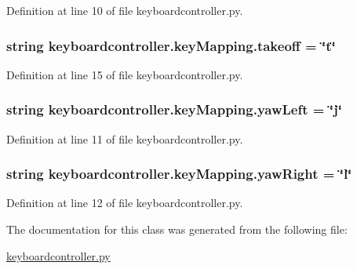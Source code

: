 Definition at line 10 of file keyboardcontroller.\-py.

\hypertarget{classkeyboardcontroller_1_1keyMapping_aaea5bb05c7a1f0dc6353fe686b5a8159}{
\subsubsection[{takeoff}]{\setlength{\rightskip}{0pt plus 5cm}string keyboardcontroller.\-key\-Mapping.\-takeoff = \char`\"{}t\char`\"{}\hspace{0.3cm}{\ttfamily [static]}}}\label{classkeyboardcontroller_1_1keyMapping_aaea5bb05c7a1f0dc6353fe686b5a8159}


Definition at line 15 of file keyboardcontroller.\-py.

\hypertarget{classkeyboardcontroller_1_1keyMapping_a8fe5634f1db0cb7509ec14446df8c6e3}{
\subsubsection[{yaw\-Left}]{\setlength{\rightskip}{0pt plus 5cm}string keyboardcontroller.\-key\-Mapping.\-yaw\-Left = \char`\"{}j\char`\"{}\hspace{0.3cm}{\ttfamily [static]}}}\label{classkeyboardcontroller_1_1keyMapping_a8fe5634f1db0cb7509ec14446df8c6e3}


Definition at line 11 of file keyboardcontroller.\-py.

\hypertarget{classkeyboardcontroller_1_1keyMapping_ad8449d6f438051685c76384a797b2bff}{
\subsubsection[{yaw\-Right}]{\setlength{\rightskip}{0pt plus 5cm}string keyboardcontroller.\-key\-Mapping.\-yaw\-Right = \char`\"{}l\char`\"{}\hspace{0.3cm}{\ttfamily [static]}}}\label{classkeyboardcontroller_1_1keyMapping_ad8449d6f438051685c76384a797b2bff}


Definition at line 12 of file keyboardcontroller.\-py.



The documentation for this class was generated from the following file\-:\begin{DoxyCompactItemize}
\item 
\hyperlink{keyboardcontroller_8py}{keyboardcontroller.\-py}\end{DoxyCompactItemize}
